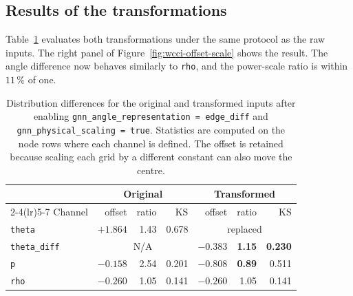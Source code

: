\subsection{Results of the transformations}
\label{sec:wcci-corrected}

Table~\ref{tab:wcci-corrected} evaluates both transformations
under the same protocol as the raw inputs. The right panel of
Figure~\ref{fig:wcci-offset-scale} shows the result. The angle difference now
behaves similarly to \texttt{rho}, and the power-scale ratio is within
$11\,\%$ of one.

\begin{table}[H]
  \centering
  \small
  \caption{Distribution differences for the original and transformed inputs
  after enabling
  \texttt{gnn\_angle\_representation = edge\_diff} and
  \texttt{gnn\_physical\_scaling = true}. Statistics are computed on the node
  rows where each channel is defined. The offset is retained because scaling
  each grid by a different constant can also move the centre.}
  \label{tab:wcci-corrected}
  \setlength{\tabcolsep}{6pt}
  \begin{tabular}{lrrr|rrr}
    \toprule
    & \multicolumn{3}{c|}{Original} & \multicolumn{3}{c}{Transformed} \\
    \cmidrule(lr){2-4}\cmidrule(lr){5-7}
    Channel & offset & ratio & KS & offset & ratio & KS \\
    \midrule
    \texttt{theta}      & $+1.864$ & 1.43 & 0.678 & \multicolumn{3}{c}{replaced} \\
    \texttt{theta\_diff} & \multicolumn{3}{c|}{N/A} & $-0.383$ & \textbf{1.15} & \textbf{0.230} \\
    \texttt{p}          & $-0.158$ & 2.54 & 0.201 & $-0.808$ & \textbf{0.89} & 0.511 \\
    \texttt{rho}        & $-0.260$ & 1.05 & 0.141 & $-0.260$ & 1.05 & 0.141 \\
    \bottomrule
  \end{tabular}
\end{table}

